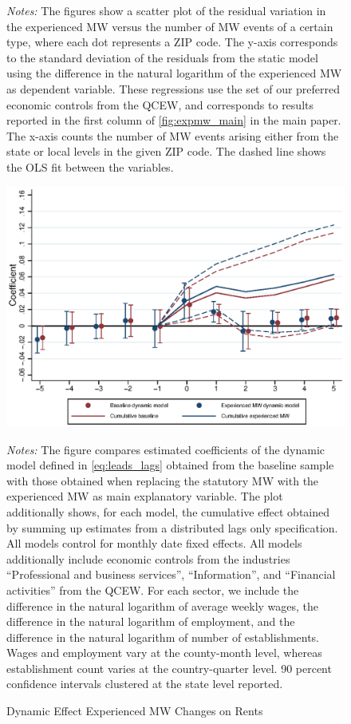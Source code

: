 \begin{figure}[htb!]
\begin{minipage}{0.95\textwidth}
		\vspace{3mm}	
		\textit{Notes:} The figures show a scatter plot of the residual variation in the 
		experienced MW versus the number of MW events of a certain type, where each dot represents 
		a ZIP code. The y-axis corresponds to the standard deviation of the residuals from the static 
		model using the difference in the natural logarithm of the experienced MW as dependent variable. 
		These regressions use the set of our preferred economic controls from the QCEW, and corresponds 
		to results reported in the first column of \autoref{fig:expmw_main} in the main paper. The 
		x-axis counts the number of MW events arising either from the state or local levels in the 
		given ZIP code. The dashed line shows the OLS fit between the variables.
	\end{minipage}
\end{figure}

\begin{figure}[!h]
	\centering
	\caption{Dynamic Effect Experienced MW Changes on Rents}
	\label{fig:expmw_dynamic}
	\includegraphics[width = .9\textwidth]
		{../../analysis/first_differences_expmw/output/fd_model_comparison_expmw.eps}
	\begin{minipage}{.95\textwidth}\footnotesize
		\textit{Notes:} The figure compares estimated coefficients of the dynamic model defined in 
		\autoref{eq:leads_lags} obtained from the baseline sample with those obtained when replacing 
		the statutory MW with the experienced MW as main explanatory variable. The plot additionally 
		shows, for each model, the cumulative effect obtained by summing up estimates from a 
		distributed lags only specification. All models control for monthly date fixed effects. 
		All models additionally include economic controls from the industries ``Professional and 
		business services'', ``Information'', and ``Financial activities'' from the QCEW. For each
		sector, we include the difference in the natural logarithm of average weekly wages, the 
		difference in the natural logarithm of employment, and the difference in the natural 
		logarithm of number of establishments. Wages and employment vary at the county-month level,
		whereas establishment count varies at the country-quarter level.
		90 percent confidence intervals clustered at the state level reported. 
	\end{minipage}
\end{figure}

